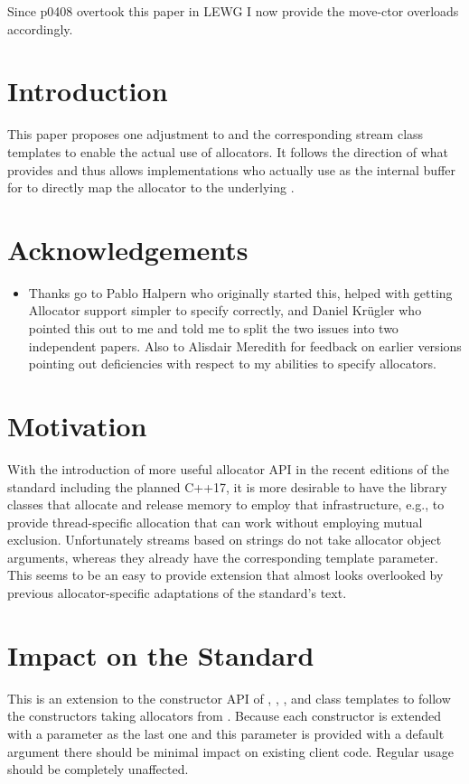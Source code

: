 \documentclass[ebook,11pt,article]{memoir}
\begin{document}
Since p0408 overtook this paper in LEWG I now provide the move-ctor overloads accordingly.


\chapter{Introduction}
This paper proposes one adjustment to  and the corresponding stream class templates to enable the actual use of allocators. It follows the direction of what  provides and thus allows implementations who actually use  as the internal buffer for  to directly map the allocator to the underlying .

\chapter{Acknowledgements}
\begin{itemize}
\item Thanks go to Pablo Halpern who originally started this, helped with getting Allocator support simpler to specify correctly, and Daniel Kr\"ugler who pointed this out to me and told me to split the two issues into two independent papers. Also to Alisdair Meredith for feedback on earlier versions pointing out deficiencies with respect to my abilities to specify allocators.
\end{itemize}

\chapter{Motivation}
With the introduction of more useful allocator API in the recent editions of the standard including the planned C++17, it is more desirable to have the library classes that allocate and release memory to employ that infrastructure, e.g., to provide thread-specific allocation that can work without employing mutual exclusion. Unfortunately streams based on strings do not take allocator object arguments, whereas they already have the corresponding template parameter. This seems to be an easy to provide extension that almost looks overlooked by previous allocator-specific adaptations of the standard's text.
\begin{codeblock}
\end{codeblock}

\chapter{Impact on the Standard}
This is an extension to the constructor API of , , , and  class templates to follow the constructors taking allocators from . Because each constructor is extended with a parameter as the last one and this parameter is provided with a default argument there should be minimal impact on existing client code. Regular usage should be completely unaffected. 
\end{document}
